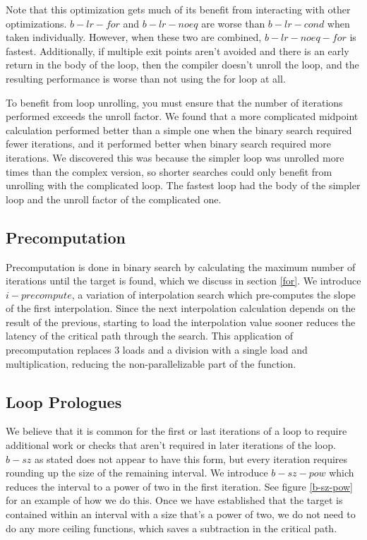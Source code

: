 \documentclass[twocolumn]{article}
\begin{document}
Note that this optimization gets much of its benefit from interacting with other optimizations. $b-lr-for$ and $b-lr-noeq$ are worse than $b-lr-cond$ when taken individually. However, when these two are combined, $b-lr-noeq-for$ is fastest. Additionally, if multiple exit points aren't avoided and there is an early return in the body of the loop, then the compiler doesn't unroll the loop, and the resulting performance is worse than not using the for loop at all.

To benefit from loop unrolling, you must ensure that the number of iterations performed exceeds the unroll factor. We found that a more complicated midpoint calculation performed better than a simple one when the binary search required fewer iterations, and it performed better when binary search required more iterations. We discovered this was because the simpler loop was unrolled more times than the complex version, so shorter searches could only benefit from unrolling with the complicated loop. The fastest loop had the body of the simpler loop and the unroll factor of the complicated one.

\subsection{Precomputation}
\label{precomputation}
Precomputation is done in binary search by calculating the maximum number of iterations until the target is found, which we discuss in section \ref{for}. We introduce $i-precompute$, a variation of interpolation search which pre-computes the slope of the first interpolation. Since the next interpolation calculation depends on the result of the previous, starting to load the interpolation value sooner reduces the latency of the critical path through the search. This application of precomputation replaces 3 loads and a division with a single load and multiplication, reducing the non-parallelizable part of the function.

\subsection{Loop Prologues}
\label{prologues}
We believe that it is common for the first or last iterations of a loop to require additional work or checks that aren't required in later iterations of the loop. $b-sz$ as stated does not appear to have this form, but every iteration requires rounding up the size of the remaining interval. We introduce $b-sz-pow$ which reduces the interval to a power of two in the first iteration. See figure \ref{b-sz-pow} for an example of how we do this. Once we have established that the target is contained within an interval with a size that's a power of two, we do not need to do any more ceiling functions, which saves a subtraction in the critical path.
\end{document}
